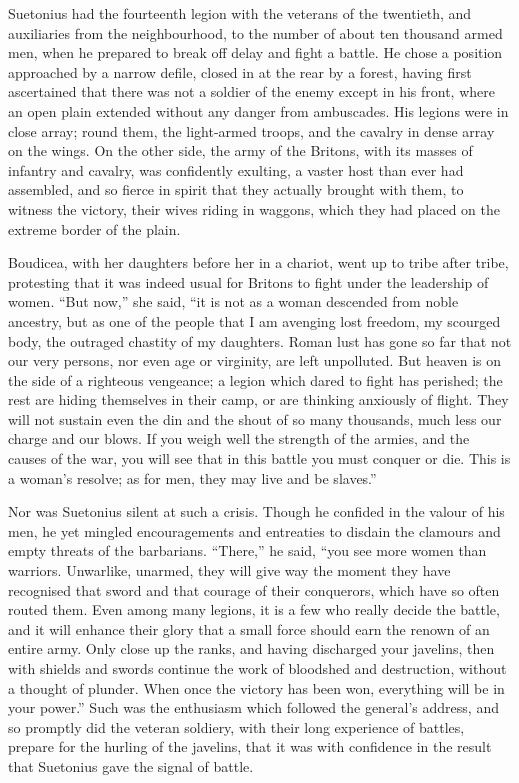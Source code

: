 
Suetonius had the fourteenth legion with the veterans of the twentieth, and auxiliaries from the neighbourhood, to the number of about ten thousand armed men, when he prepared to break off delay and fight a battle. He chose a position approached by a narrow defile, closed in at the rear by a forest, having first ascertained that there was not a soldier of the enemy except in his front, where an open plain extended without any danger from ambuscades. His legions were in close array; round them, the light-armed troops, and the cavalry in dense array on the wings. On the other side, the army of the Britons, with its masses of infantry and cavalry, was confidently exulting, a vaster host than ever had assembled, and so fierce in spirit that they actually brought with them, to witness the victory, their wives riding in waggons, which they had placed on the extreme border of the plain.


Boudicea, with her daughters before her in a chariot, went up to tribe after tribe, protesting that it was indeed usual for Britons to fight under the leadership of women. ``But now,'' she said, ``it is not as a woman descended from noble ancestry, but as one of the people that I am avenging lost freedom, my scourged body, the outraged chastity of my daughters. Roman lust has gone so far that not our very persons, nor even age or virginity, are left unpolluted. But heaven is on the side of a righteous vengeance; a legion which dared to fight has perished; the rest are hiding themselves in their camp, or are thinking anxiously of flight. They will not sustain even the din and the shout of so many thousands, much less our charge and our blows. If you weigh well the strength of the armies, and the causes of the war, you will see that in this battle you must conquer or die. This is a woman's resolve; as for men, they may live and be slaves.''


Nor was Suetonius silent at such a crisis. Though he confided in the valour of his men, he yet mingled encouragements and entreaties to disdain the clamours and empty threats of the barbarians. ``There,'' he said, ``you see more women than warriors. Unwarlike, unarmed, they will give way the moment they have recognised that sword and that courage of their conquerors, which have so often routed them. Even among many legions, it is a few who really decide the battle, and it will enhance their glory that a small force should earn the renown of an entire army. Only close up the ranks, and having discharged your javelins, then with shields and swords continue the work of bloodshed and destruction, without a thought of plunder. When once the victory has been won, everything will be in your power.'' Such was the enthusiasm which followed the general's address, and so promptly did the veteran soldiery, with their long experience of battles, prepare for the hurling of the javelins, that it was with confidence in the result that Suetonius gave the signal of battle.


